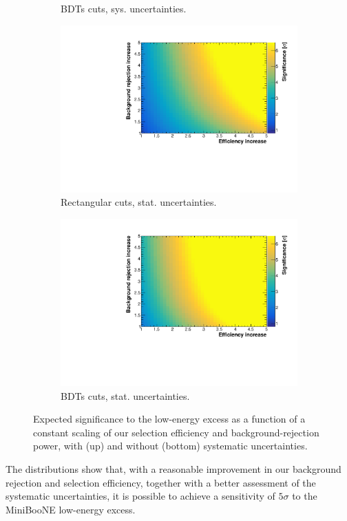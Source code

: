 \begin{figure}[htbp]
\begin{center}
\begin{subfigure}{0.48\textwidth}
      \caption{BDTs cuts, sys. uncertainties.} 
    \end{subfigure}
     \begin{subfigure}{0.48\textwidth}
      \includegraphics[width=\linewidth]{figures/cuts_2d_stat.pdf}
      \caption{Rectangular cuts, stat. uncertainties.}  
    \end{subfigure}\hfill
    \begin{subfigure}{0.48\textwidth}
      \includegraphics[width=\linewidth]{figures/bdt_2d_stat.pdf}
      \caption{BDTs cuts, stat. uncertainties.} 
    \end{subfigure}
    \caption{Expected significance to the low-energy excess as a function of a constant scaling of our selection efficiency and background-rejection power, with (up) and without (bottom) systematic uncertainties.}\label{fig:improvements}
	\end{center}
\end{figure}

The distributions show that, with a reasonable improvement in our background rejection and selection efficiency, together with a better assessment of the systematic uncertainties, it is possible to achieve a sensitivity of $5\sigma$ to the MiniBooNE low-energy excess.

